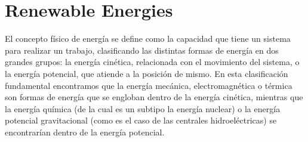 





\section{Renewable Energies}

El concepto físico de energía se define como la capacidad que tiene un sistema para realizar un trabajo, clasificando las distintas formas de energía en dos grandes grupos: la energía cinética, relacionada con el movimiento del sistema, o la energía potencial, que atiende a la posición de mismo. En esta clasificación fundamental encontramos que la energía mecánica, electromagnética o térmica son formas de energía que se engloban dentro de la energía cinética, mientras que la energía química (de la cual es un subtipo la energía nuclear) o la energía potencial gravitacional (como es el caso de las centrales hidroeléctricas) se encontrarían dentro de la energía potencial.

